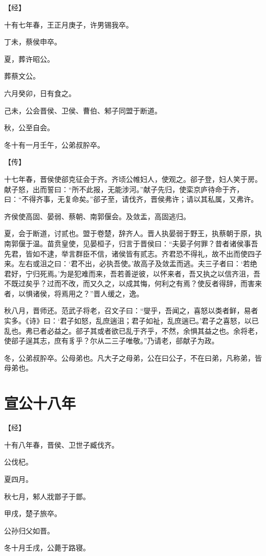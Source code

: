\documentclass[a4paper,12pt,UTF8,twoside]{ctexbook}
\begin{document}
【经】

十有七年春，王正月庚子，许男锡我卒。

丁未，蔡侯申卒。

夏，葬许昭公。

葬蔡文公。

六月癸卯，日有食之。

己未，公会晋侯、卫侯、曹伯、邾子同盟于断道。

秋，公至自会。

冬十有一月壬午，公弟叔肸卒。

【传】

十七年春，晋侯使郤克征会于齐。齐顷公帷妇人，使观之。郤子登，妇人笑于房。献子怒，出而誓曰：“所不此报，无能涉河。”献子先归，使栾京庐待命于齐，曰：“不得齐事，无复命矣。”郤子至，请伐齐，晋侯弗许；请以其私属，又弗许。

齐侯使高固、晏弱、蔡朝、南郭偃会。及敛盂，高固逃归。

夏，会于断道，讨贰也。盟于卷楚，辞齐人。晋人执晏弱于野王，执蔡朝于原，执南郭偃于温。苗贲皇使，见晏桓子，归言于晋侯曰：“夫晏子何罪？昔者诸侯事吾先君，皆如不逮，举言群臣不信，诸侯皆有贰志。齐君恐不得礼，故不出而使四子来。左右或沮之曰：‘君不出，必执吾使。’故高子及敛盂而逃。夫三子者曰：‘若绝君好，宁归死焉。’为是犯难而来，吾若善逆彼，以怀来者，吾又执之以信齐沮，吾不既过矣乎？过而不改，而又久之，以成其悔，何利之有焉？使反者得辞，而害来者，以惧诸侯，将焉用之？”晋人缓之，逸。

秋八月，晋师还。范武子将老，召文子曰：“燮乎，吾闻之，喜怒以类者鲜，易者实多。《诗》曰：‘君子如怒，乱庶遄沮；君子如祉，乱庶遄已。’君子之喜怒，以已乱也。弗已者必益之。郤子其或者欲已乱于齐乎，不然，余惧其益之也。余将老，使郤子逞其志，庶有豸乎？尔从二三子唯敬。”乃请老，郤献子为政。

冬，公弟叔肸卒。公母弟也。凡大子之母弟，公在曰公子，不在曰弟，凡称弟，皆母弟也。


\chapter{宣公十八年}


【经】

十有八年春，晋侯、卫世子臧伐齐。

公伐杞。

夏四月。

秋七月，邾人戕鄫子于鄫。

甲戌，楚子旅卒。

公孙归父如晋。

冬十月壬戌，公薨于路寝。
\end{document}
